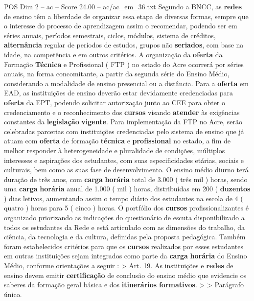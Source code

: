 \begin{textsample}{POS Dim 2 – ac – Score 24.00 – ac/ac\_em\_36.txt}
Segundo a BNCC, as \textbf{redes} de ensino têm a liberdade de organizar essa etapa de diversas formas, sempre que o interesse do processo de aprendizagem assim o recomendar, podendo ser em séries anuais, períodos semestrais, ciclos, módulos, sistema de créditos, \textbf{alternância} regular de períodos de estudos, grupos não \textbf{seriados}, com base na idade, na competência e em outros critérios.
A organização da \textbf{oferta} da Formação \textbf{Técnica} e Profissional ( FTP ) no estado do Acre ocorrerá por séries anuais, na forma concomitante, a partir da segunda série do Ensino Médio, considerando a modalidade de ensino presencial ou a distância.
Para a \textbf{oferta} em EAD, as instituições de ensino deverão estar devidamente credenciadas para \textbf{oferta} da EPT, podendo solicitar autorização junto ao CEE para obter o credenciamento e o reconhecimento dos \textbf{cursos} visando \textbf{atender} às exigências constantes da \textbf{legislação} \textbf{vigente}.
Para implementação da FTP no Acre, serão celebradas parcerias com instituições credenciadas pelo sistema de ensino que já atuam com \textbf{oferta} de formação \textbf{técnica} e \textbf{profissional} no estado, a fim de melhor responder à heterogeneidade e pluralidade de condições, múltiplos interesses e aspirações dos estudantes, com suas especificidades etárias, sociais e culturais, bem como as suas fase de desenvolvimento.
O ensino médio diurno terá duração de três anos, com \textbf{carga} \textbf{horária} total de 3.000 ( três mil ) horas, sendo uma \textbf{carga} \textbf{horária} anual de 1.000 ( mil ) horas, distribuídas em 200 ( \textbf{duzentos} ) dias letivos, aumentando assim o tempo diário dos estudantes na escola de 4 ( quatro ) horas para 5 ( cinco ) horas.
O portfólio dos \textbf{cursos} profissionalizantes é organizado priorizando as indicações do questionário de escuta disponibilizado a todos os estudantes da Rede e está articulado com as dimensões do trabalho, da ciência, da tecnologia e da cultura, definidas pela proposta pedagógica.
Também foram estabelecidos critérios para que os \textbf{cursos} realizados por esses estudantes em outras instituições sejam integrados como parte da \textbf{carga} \textbf{horária} do Ensino Médio, conforme orientações a seguir : > Art. 19.
As instituições e \textbf{redes} de ensino devem emitir \textbf{certificação} de conclusão do ensino médio que evidencie os saberes da formação geral básica e dos \textbf{itinerários} \textbf{formativos}. > > Parágrafo único.

\end{textsample}
